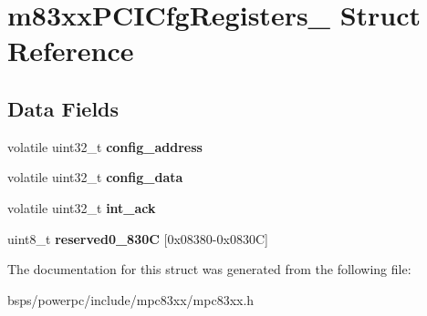 \hypertarget{structm83xxPCICfgRegisters__}{}\section{m83xx\+P\+C\+I\+Cfg\+Registers\+\_\+ Struct Reference}
\label{structm83xxPCICfgRegisters__}
\subsection*{Data Fields}
\begin{DoxyCompactItemize}
\item 
\mbox{\label{structm83xxPCICfgRegisters___a885dd8f0f81d12bb9001ecb07b7ef653}} 
volatile uint32\+\_\+t {\bfseries config\+\_\+address}
\item 
\mbox{\label{structm83xxPCICfgRegisters___abf58e8388987a76aa275675de480def0}} 
volatile uint32\+\_\+t {\bfseries config\+\_\+data}
\item 
\mbox{\label{structm83xxPCICfgRegisters___ade734185523173942c86b880649de854}} 
volatile uint32\+\_\+t {\bfseries int\+\_\+ack}
\item 
\mbox{\label{structm83xxPCICfgRegisters___ac8ce00f0ccde113a9e4a8ff26bbd78aa}} 
uint8\+\_\+t {\bfseries reserved0\+\_\+830C} \mbox{[}0x08380-\/0x0830\+C\mbox{]}
\end{DoxyCompactItemize}


The documentation for this struct was generated from the following file\+:\begin{DoxyCompactItemize}
\item 
bsps/powerpc/include/mpc83xx/mpc83xx.\+h\end{DoxyCompactItemize}
